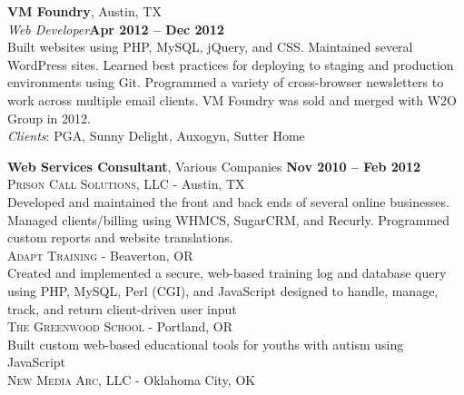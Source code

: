 \documentclass[margin,line]{resume}
\begin{document}
\begin{resume}
\textbf{VM Foundry}, Austin, TX
\vspace{2mm}\\
\textsl{Web Developer}\hfill \textbf{Apr 2012 -- Dec 2012}\vspace{1mm}\\
Built websites using PHP, MySQL, jQuery, and CSS. Maintained several WordPress sites. Learned best practices for deploying to staging and production environments using Git. Programmed a variety of cross-browser newsletters to work across multiple email clients. VM Foundry was sold and merged with W2O Group in 2012.\vspace{1mm}\\
\textsl{Clients}: {\small PGA, Sunny Delight, Auxogyn, Sutter Home}


\textbf{Web Services Consultant}, Various Companies \hfill \textbf{Nov 2010 -- Feb 2012}\vspace{2mm}\\
\textsc{Prison Call Solutions, LLC} - Austin, TX\vspace{1mm}\\%
Developed and maintained the front and back ends of several online businesses. Managed clients/billing using WHMCS, SugarCRM, and Recurly. Programmed custom reports and website translations.
\vspace{2mm}\\
\textsc{Adapt Training} - Beaverton, OR\vspace{1mm}\\%
Created and implemented a secure, web-based training log and database query using PHP, MySQL, Perl (CGI), and JavaScript designed to handle, manage, track, and return client-driven user input
\vspace{2mm}\\
\textsc{The Greenwood School} - Portland, OR\vspace{1mm}\\%
Built custom web-based educational tools for youths with autism using JavaScript
\vspace{2mm}\\
\textsc{New Media Arc, LLC} - Oklahoma City, OK\vspace{1mm}\\%

\end{resume}
\end{document}
